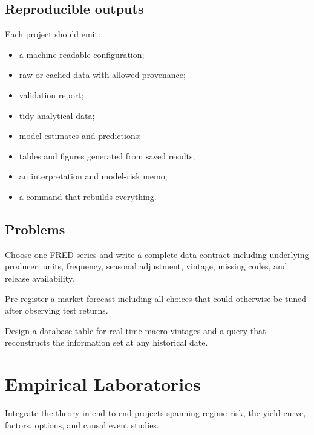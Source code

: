 \section{Reproducible outputs}

Each project should emit:

\begin{itemize}
\item a machine-readable configuration;
\item raw or cached data with allowed provenance;
\item validation report;
\item tidy analytical data;
\item model estimates and predictions;
\item tables and figures generated from saved results;
\item an interpretation and model-risk memo;
\item a command that rebuilds everything.
\end{itemize}

\section{Problems}

\begin{exercise}
Choose one FRED series and write a complete data contract including underlying
producer, units, frequency, seasonal adjustment, vintage, missing codes, and release
availability.
\end{exercise}
\begin{exercise}
Pre-register a market forecast including all choices that could otherwise be tuned
after observing test returns.
\end{exercise}
\begin{exercise}
Design a database table for real-time macro vintages and a query that reconstructs
the information set at any historical date.
\end{exercise}


\chapter{Empirical Laboratories}

\begin{objectives}
Integrate the theory in end-to-end projects spanning regime risk, the yield curve,
factors, options, and causal event studies.
\end{objectives}

